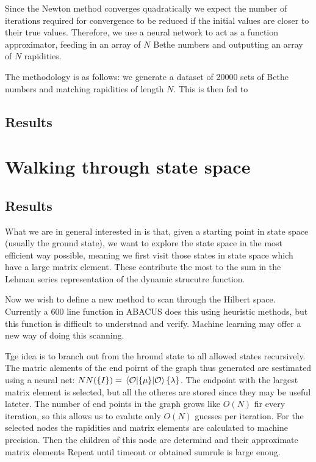 \documentclass[11pt, a4paper]{report} %
\begin{document}
Since the Newton method converges quadratically we expect the number of iterations required for convergence to be reduced if the initial values are closer to their true values.
Therefore, we use a neural network to act as a function approximator, feeding in an array of \(N\) Bethe numbers and outputting an array of \(N\) rapidities.

The methodology is as follows: we generate a dataset of 20000 sets of Bethe numbers and matching rapidities of length \(N\).
This is then fed to

\subsection{Results}

\section{Walking through state space}

\subsection{Results}

What we are in general interested in is that, given a starting point in state space (usually the ground state), we want to explore the state space in the most efficient way possible, meaning we first visit those states in state space which have a large matrix element. 
These contribute the most to the sum in the Lehman series representation of the dynamic strucutre function.





Now we wish to define a new method to scan through the Hilbert space.
Currently a 600 line function in ABACUS does this using heuristic methods, but this function is difficult to understnad and verify.
Machine learning may offer a new way of doing this scanning.

Tge idea is to branch out from the hround state to all allowed states recursively.
The matric alements of the end poirnt of the graph thus generated are sestimated using a neural net: $NN(\{I\}) = \expval{\{\mu\}}{\mathcal{O}}{\{\lambda\}}$.
The endpoint with the largest matrix element is selected, but all the otheres are stored since they may be useful lateter.
The number of end points in the graph grows like $O(N)$ fir every iteration, so this allows us to evalute only $O(N)$ guesses per iteration.
For the selected nodes the rapidities and matrix elements are calculated to machine precision.
Then the children of this node are determind and their approximate matrix elements
Repeat until timeout or obtained sumrule is large enoug.
\end{document}
